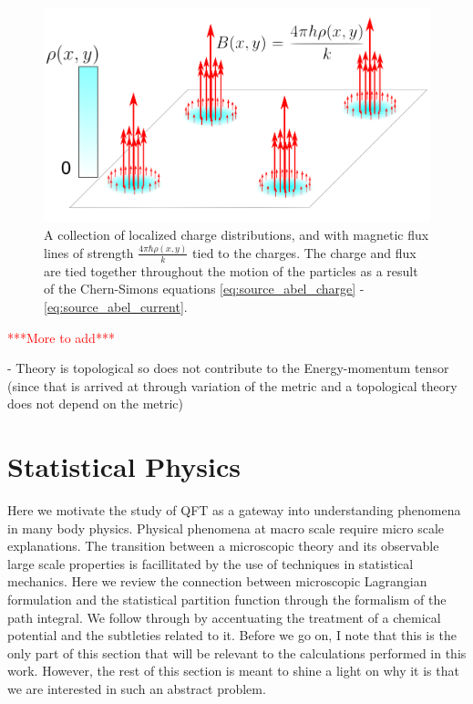 \begin{figure}[htb]
	\centering
		\includegraphics[scale=0.17]{Background_Folder/figures/flux_attachment_improved.pdf}
    \caption{A collection of localized charge distributions, and with magnetic flux lines of strength $\frac{4 \pi \hbar \rho(x,y)}{k}$ tied to the charges. The charge and flux are tied together throughout the motion of the particles as a result of the Chern-Simons equations \eqref{eq:source_abel_charge} - \eqref{eq:source_abel_current}.} \label{fig:flux_attachment}
\end{figure}





    



\textcolor{red}{***More to add***}

        - Theory is topological so does not contribute to the Energy-momentum tensor (since that is arrived at through variation of the metric and a topological theory does not depend on the metric)\\
        \section{Statistical Physics}

        Here we motivate the study of QFT as a gateway into understanding phenomena in many body physics. Physical phenomena at macro scale require micro scale explanations. The transition between a microscopic theory and its observable large scale properties is facillitated by the use of techniques in statistical mechanics. Here we review the connection between microscopic Lagrangian formulation and the statistical partition function through the formalism of the path integral. We follow through by accentuating the treatment of a chemical potential and the subtleties related to it. Before we go on, I note that this is the only part of this section that will be relevant to the calculations performed in this work. However, the rest of this section is meant to shine a light on why it is that we are interested in such an abstract problem.

